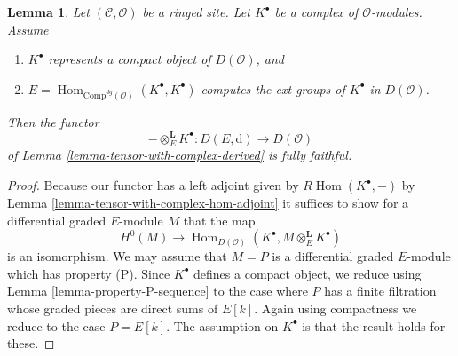 \documentclass{stacks-project}
\theoremstyle{plain}
\newtheorem{lemma}[subsection]{Lemma}
\theoremstyle{definition}
\theoremstyle{remark}
\numberwithin{equation}{subsection}
\def\Hom{\mathop{\mathrm{Hom}}\nolimits}
\begin{document}
\begin{lemma}
\label{lemma-fully-faithful-in-compact-case}
Let $(\mathcal{C}, \mathcal{O})$ be a ringed site.
Let $K^\bullet$ be a complex of $\mathcal{O}$-modules.
Assume
\begin{enumerate}
\item $K^\bullet$ represents a compact object of $D(\mathcal{O})$, and
\item $E = \Hom_{\text{Comp}^{dg}(\mathcal{O})}(K^\bullet, K^\bullet)$
computes the ext groups of $K^\bullet$ in $D(\mathcal{O})$.
\end{enumerate}
Then the functor
$$
- \otimes_E^\mathbf{L} K^\bullet :
D(E, \text{d})
\longrightarrow
D(\mathcal{O})
$$
of Lemma \ref{lemma-tensor-with-complex-derived} is fully faithful.
\end{lemma}

\begin{proof}
Because our functor has a left adjoint given by
$R\Hom(K^\bullet, -)$ by Lemma \ref{lemma-tensor-with-complex-hom-adjoint}
it suffices to show for a differential graded $E$-module $M$ that the map
$$
H^0(M) \longrightarrow
\Hom_{D(\mathcal{O})}(K^\bullet, M \otimes_E^\mathbf{L} K^\bullet)
$$
is an isomorphism. We may assume that $M = P$ is a differential graded
$E$-module which has property (P). Since $K^\bullet$ defines a
compact object, we reduce using
Lemma \ref{lemma-property-P-sequence}
to the case where $P$ has a finite filtration whose graded pieces
are direct sums of $E[k]$. Again using compactness we reduce
to the case $P = E[k]$. The assumption on $K^\bullet$ is that
the result holds for these.
\end{proof}
\end{document}
